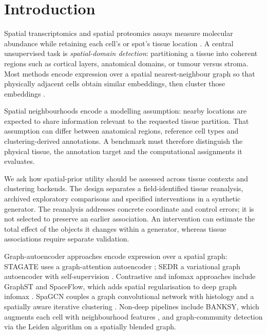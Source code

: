 \documentclass[journal]{IEEEtran}
\begin{document}
\section{Introduction}
Spatial transcriptomics and spatial proteomics assays measure molecular abundance while retaining each
cell's or spot's tissue location \citep{stahl2016st,moffitt2018merfish}. A central unsupervised task is
\emph{spatial-domain detection}: partitioning a tissue into coherent regions such as cortical layers,
anatomical domains, or tumour versus stroma. Most methods encode expression over a spatial nearest-neighbour graph so
that physically adjacent cells obtain similar embeddings, then cluster those embeddings
\citep{dong2022stagate,xu2024sedr,long2023graphst,ren2022spaceflow,hu2021spagcn}.

Spatial neighbourhoods encode a modelling assumption: nearby locations are expected to share information relevant to the requested tissue partition. That assumption can differ between anatomical regions, reference cell types and clustering-derived annotations. A benchmark must therefore distinguish the physical tissue, the annotation target and the computational assignments it evaluates.

We ask how spatial-prior utility should be assessed across tissue contexts and clustering backends. The design separates a field-identified tissue reanalysis, archived exploratory comparisons and specified interventions in a synthetic generator. The reanalysis addresses concrete coordinate and control errors; it is not selected to preserve an earlier association. An intervention can estimate the total effect of the objects it changes within a generator, whereas tissue associations require separate validation.

\noindent
Graph-autoencoder approaches encode expression over a spatial graph:
STAGATE uses a graph-attention autoencoder \citep{dong2022stagate}; SEDR a variational graph autoencoder
with self-supervision \citep{xu2024sedr}. Contrastive and infomax approaches include GraphST
\citep{long2023graphst} and SpaceFlow, which adds spatial regularisation to deep graph infomax
\citep{ren2022spaceflow}. SpaGCN couples a graph convolutional network with histology and a spatially
aware iterative clustering \citep{hu2021spagcn}. Non-deep pipelines include BANKSY, which augments each
cell with neighbourhood features \citep{singhal2024banksy}, and graph-community detection via the Leiden
algorithm \citep{traag2019leiden} on a spatially blended graph.
\end{document}

